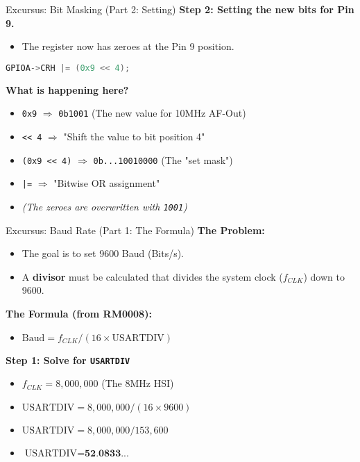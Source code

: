 \documentclass{beamer}
\begin{document}
\begin{frame}[fragile]{Excursus: Bit Masking (Part 2: Setting)}
\textbf{Step 2: Setting the new bits for Pin 9.}
\begin{itemize}
\item The register now has zeroes at the Pin 9 position.
\end{itemize}

\bigskip
\begin{lstlisting}[language=C, style=mystyle]
GPIOA->CRH |= (0x9 << 4);
\end{lstlisting}

\textbf{What is happening here?}
\begin{itemize}
\item \texttt{0x9} $\Rightarrow$ \texttt{0b1001} (The new value for 10MHz AF-Out)
\item \texttt{<< 4} $\Rightarrow$ "Shift the value to bit position 4"
\item \texttt{(0x9 << 4)} $\Rightarrow$ \texttt{0b...10010000} (The "set mask")
\item \texttt{|=} $\Rightarrow$ "Bitwise OR assignment"
\item \textit{(The zeroes are overwritten with \texttt{1001})}
\end{itemize}
\end{frame}

\begin{frame}{Excursus: Baud Rate (Part 1: The Formula)}
\textbf{The Problem:}
\begin{itemize}
\item The goal is to set 9600 Baud (Bits/s).
\item A \textbf{divisor} must be calculated that divides the system clock ($f_{CLK}$) down to 9600.
\end{itemize}

\textbf{The Formula (from RM0008):}
\begin{itemize}
\item $\text{Baud} = f_{CLK} / (16 \times \text{USARTDIV})$
\end{itemize}

\textbf{Step 1: Solve for \texttt{USARTDIV}}
\begin{itemize}
\item $f_{CLK} = 8,000,000$ (The 8MHz HSI)
\item $\text{USARTDIV} = 8,000,000 / (16 \times 9600)$
\item $\text{USARTDIV} = 8,000,000 / 153,600$
\item $\text{USARTDIV} = \textbf{52.0833...}$
\end{itemize}
\end{frame}
\end{document}
